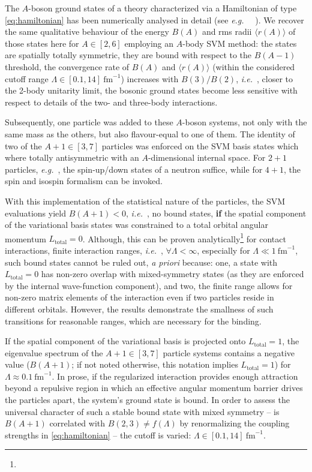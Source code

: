 \documentclass[preprint,12pt]{elsarticle}
\newcommand{\eg}{\textit{e.g.}~}
\newcommand{\ie}{\textit{i.e.}~}
\newcommand{\rms}[1]{\ensuremath{\langle r(#1)\rangle}}
\begin{document}
The $A$-boson ground states of a theory characterized via a Hamiltonian of type \eqref{eq:hamiltonian}
has been numerically analysed in detail (see \eg~ \cite{}).
We recover the same qualitative behaviour of the energy $B(A)$ and rms radii $\rms{A}$ of those states here for $A\in[2,6]$
employing an $A$-body SVM method: the states are spatially totally symmetric, they are bound with respect to the
$B(A-1)$ threshold, the convergence rate of $B(A)$ and $\rms{A}$ (within the considered cutoff range
$\Lambda\in[0.1,14]~\text{fm}^{-1}$) increases with $B(3)/B(2)$, \ie, closer to the 2-body unitarity limit, the bosonic
ground states become less sensitive with respect to details of the two- and three-body interactions.

Subsequently, one particle was added to these $A$-boson systems, not only with the same mass as the others, but also 
flavour-equal to one of them.
The identity of two of the $A+1\in[3,7]$ particles was enforced on the SVM basis states which where totally
antisymmetric with an $A$-dimensional internal space. For $2+1$ particles, \eg, the spin-up/down states of a neutron suffice,
while for $4+1$, the spin and isospin formalism can be invoked.

With this implementation of the statistical nature of the particles, the SVM evaluations yield $B(A+1)<0$, \ie, no bound 
states,
{\bf if} the spatial component of the variational basis states was constrained to
a total orbital angular momentum $L_\text{total}=0$.
Although, this can be proven analytically\footnote{} for contact interactions,
finite interaction ranges, \ie, $\forall\Lambda<\infty$, especially for $\Lambda\ll 1~\text{fm}^{-1}$, such 
bound states cannot be ruled out, {\it a priori} because: one, a state with $L_\text{total}=0$ has non-zero overlap with 
mixed-symmetry states (as they are enforced by the internal wave-function component), and two, the finite range allows for 
non-zero matrix elements of the interaction even if two particles reside in different orbitals.
However, the results demonstrate the smallness of such transitions for reasonable ranges,
which are necessary for the binding.

If the spatial component of the variational basis is projected onto $L_\text{total}=1$, the eigenvalue spectrum of
the $A+1\in[3,7]$ particle systems contains a negative value ($B(A+1)$; if not noted otherwise, this notation
implies $L_\text{total}=1$) for $\Lambda\approx0.1~\text{fm}^{-1}$.
In prose, if the regularized interaction provides enough attraction beyond a repulsive region in which an effective
angular momentum barrier drives the particles apart, the system's ground state is bound.
In order to assess the universal character of such a stable bound state with mixed symmetry -- is $B(A+1)$ correlated
with $B(2,3)\neq f(\Lambda)$ by renormalizing the coupling strengths in \eqref{eq:hamiltonian} -- the cutoff
is varied: $\Lambda\in[0.1,14]~\text{fm}^{-1}$.
\end{document}
